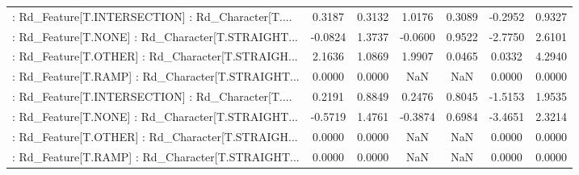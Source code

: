 \begin{longtable}{p{4cm}cccccc}
 : Rd\_Feature[T.INTERSECTION] : Rd\_Character[T.... &  0.3187 &    0.3132 &  1.0176 &       0.3089 & -0.2952 &  0.9327 \\
 : Rd\_Feature[T.NONE] : Rd\_Character[T.STRAIGHT... & -0.0824 &    1.3737 & -0.0600 &       0.9522 & -2.7750 &  2.6101 \\
 : Rd\_Feature[T.OTHER] : Rd\_Character[T.STRAIGH... &  2.1636 &    1.0869 &  1.9907 &       0.0465 &  0.0332 &  4.2940 \\
 : Rd\_Feature[T.RAMP] : Rd\_Character[T.STRAIGHT... &  0.0000 &    0.0000 &     NaN &          NaN &  0.0000 &  0.0000 \\
 : Rd\_Feature[T.INTERSECTION] : Rd\_Character[T.... &  0.2191 &    0.8849 &  0.2476 &       0.8045 & -1.5153 &  1.9535 \\
 : Rd\_Feature[T.NONE] : Rd\_Character[T.STRAIGHT... & -0.5719 &    1.4761 & -0.3874 &       0.6984 & -3.4651 &  2.3214 \\
 : Rd\_Feature[T.OTHER] : Rd\_Character[T.STRAIGH... &  0.0000 &    0.0000 &     NaN &          NaN &  0.0000 &  0.0000 \\
 : Rd\_Feature[T.RAMP] : Rd\_Character[T.STRAIGHT... &  0.0000 &    0.0000 &     NaN &          NaN &  0.0000 &  0.0000 \\
\end{longtable}

